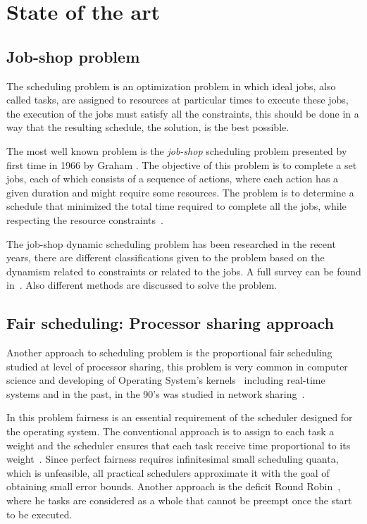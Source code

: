 \chapter{State of the art}

\section{Job-shop problem}
The scheduling problem is an optimization problem in which ideal jobs, also called tasks, are assigned to resources at particular times to execute these jobs, the execution of the jobs must satisfy all the constraints, this should be done in a way that the resulting schedule, the solution, is the best possible.

The most well known problem is the \textit{job-shop} scheduling problem presented by first time in 1966 by Graham \cite{graham66}. The objective of this problem is to complete a set jobs, each of which consists of a sequence of actions, where each action has a given duration and might require some resources. The problem is to determine a schedule that minimized the total time required to complete all the jobs, while respecting the resource constraints~\cite{russell03}.

The job-shop dynamic scheduling problem has been researched in the recent years, there are different classifications given to the problem based on the dynamism related to constraints or related to the jobs. A full survey can be found in~\cite{ouelhadj}. Also different methods are discussed to solve the problem.

\section{Fair scheduling: Processor sharing approach}

Another approach to scheduling problem is the proportional fair scheduling studied at level of processor sharing, this problem is very common in computer science and developing of Operating System's kernels~\cite{li09} including real-time systems and in the past, in the 90's was studied in network sharing~\cite{parekh93}. 

In this problem fairness is an essential requirement of the scheduler designed for the operating system. The conventional approach is to assign to each task a weight and the scheduler ensures that each task receive time proportional to its weight~\cite{katevenis91, parekh93}. Since perfect fairness requires infinitesimal small scheduling quanta, which is unfeasible, all practical schedulers approximate it with the goal of obtaining small error bounds. Another approach is the deficit Round Robin~\cite{shreedhar96}, where he tasks are considered as a whole that cannot be preempt once the start to be executed.

